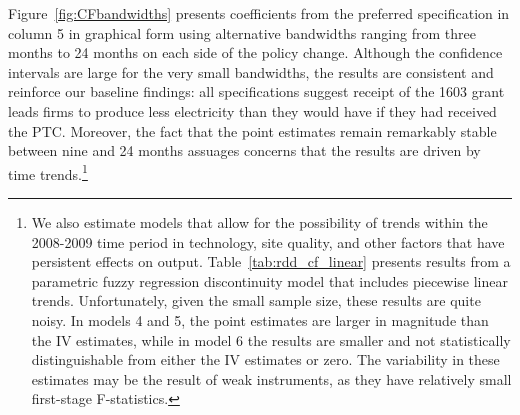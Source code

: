 \documentclass[12pt]{article}
\begin{document}
Figure~\ref{fig:CFbandwidths} presents coefficients from the preferred specification in column 5 in graphical form using alternative bandwidths ranging from three months to 24 months on each side of the policy change. Although the confidence intervals are large for the very small bandwidths, the results are consistent and reinforce our baseline findings: all specifications suggest receipt of the 1603 grant leads firms to produce less electricity than they would have if they had received the PTC. Moreover, the fact that the point estimates remain remarkably stable between nine and 24 months assuages concerns that the results are driven by time trends.\footnote{We also estimate models that allow for the possibility of trends within the 2008-2009 time period in technology, site quality, and other factors that have persistent effects on output. Table~\ref{tab:rdd_cf_linear} presents results from a parametric fuzzy regression discontinuity model that includes piecewise linear trends. Unfortunately, given the small sample size, these results are quite noisy. In models 4 and 5, the point estimates are larger in magnitude than the IV estimates, while in model 6 the results are smaller and not statistically distinguishable from either the IV estimates or zero. The variability in these estimates may be the result of weak instruments, as they have relatively small first-stage F-statistics.}
\end{document}
